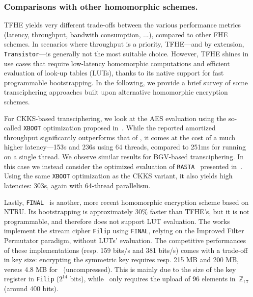 \subsubsection{Comparisons with other homomorphic schemes.} 
\gls{TFHE} yields very different trade-offs between the various performance metrics (latency, throughput, bandwith consumption, ...), compared to other \gls{FHE} schemes. In scenarios where throughput is a priority, \gls{TFHE}—and by extension, \texttt{Transistor}—is generally not the most suitable choice. However, \gls{TFHE} shines in use cases that require low-latency homomorphic computations and efficient evaluation of look-up tables (LUTs), thanks to its native support for fast programmable bootstrapping.
In the following, we provide a brief survey of some transciphering approaches built upon alternative homomorphic encryption schemes.

For CKKS-based transciphering, we look at the \gls{AES} evaluation using the so-called \texttt{XBOOT} optimization proposed in~\cite{EPRINT:NHYCKH25}. While the reported amortized throughput significantly outperforms that of \coolName, it comes at the cost of a much higher latency—153s and 236s using 64 threads, compared to 251ms for \coolName running on a single thread. We observe similar results for  BGV-based transciphering. In this case we instead consider the optimized evaluation of \texttt{RASTA}~\cite{C:DEGLLL18} presented in~\cite{EPRINT:NHYCKH25}. Using the same \texttt{XBOOT} optimization as the CKKS variant, it also yields high latencies: 303s, again with 64-thread parallelism. 


Lastly, \texttt{FINAL}~\cite{AC:BIPPS22} is another, more recent homomorphic encryption scheme based on NTRU. Its bootstrapping is approximately 30\% faster than \gls{TFHE}’s, but it is not programmable, and therefore does not support \gls{LUT} evaluation. The works~\cite{CiC:MeaParPer24,CCS:CDPP22} implement the stream cipher \texttt{Filip} using \texttt{FINAL}, relying on the Improved Filter Permutator paradigm, without LUTs' evaluation. The competitive performances of these implementations (resp. 159 bits/s and 381 bits/s) comes with a trade-off in key size: encrypting the symmetric key requires resp. 215 MB and 200 MB, versus 4.8 MB for \coolName~(uncompressed). This is mainly due to the size of the key register in \texttt{Filip} ($2^{14}$ bits), while \coolName~only requires the upload of 96 elements in~$\mathbb{Z}_{17}$ (around 400 bits).



